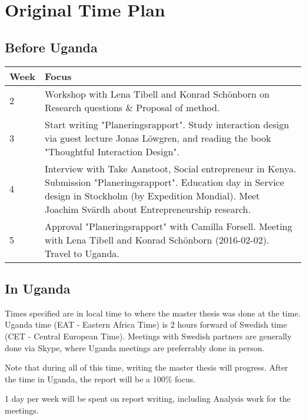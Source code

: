 \section{Original Time Plan}

\subsection{Before Uganda}

\begin{center}
    \begin{tabular}{ | l | p{10cm} |}
    \hline
    Week & Focus \\ \hline
    2 & Workshop with Lena Tibell and Konrad Schönborn on Research questions \& Proposal of method. \\ \hline
    3 & Start writing "Planeringsrapport".
    Study interaction design
    via guest lecture Jonas Löwgren,
    and reading the book "Thoughtful Interaction Design". \\ \hline
    4 & Interview with Take Aanstoot, Social entrepreneur in Kenya. Submission "Planeringsrapport". Education day in Service design in Stockholm (by Expedition Mondial). Meet Joachim Svärdh about Entrepreneurship research. \\ \hline
    5 & Approval "Planeringsrapport" with Camilla Forsell. Meeting with Lena Tibell and Konrad Schönborn (2016-02-02). Travel to Uganda. \\ \hline

    \end{tabular}
\end{center}

\subsection{In Uganda}

Times specified are in local time to where the master thesis was done at the time. Uganda time (EAT - Eastern Africa Time) is 2 hours forward of Swedish time (CET - Central European Time). Meetings with Swedish partners are generally done via Skype, where Uganda meetings are preferrably done in person.

Note that during all of this time, writing the master thesis will progress. After the time in Uganda, the report will be a 100\% focus.

1 day per week will be spent on report writing, including Analysis work for the meetings.

